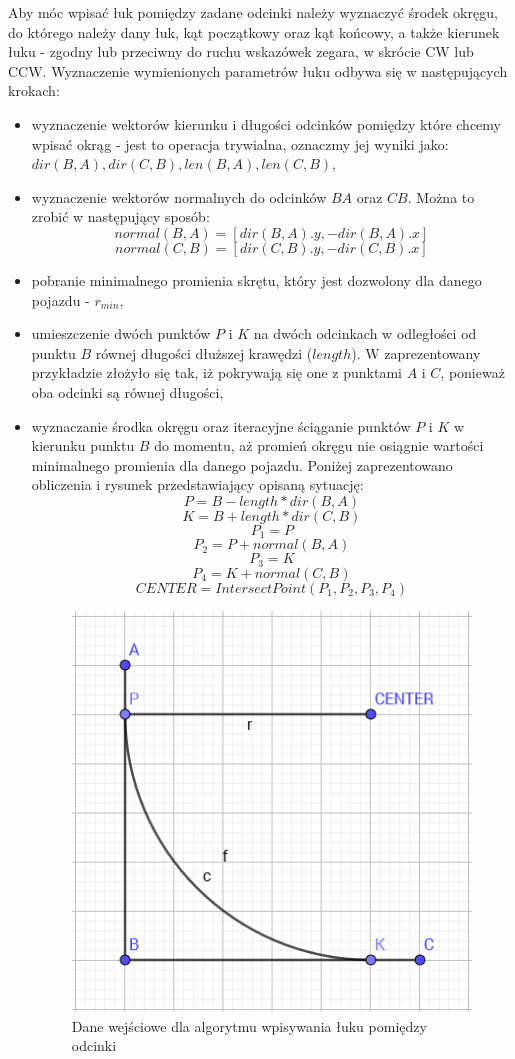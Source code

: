 \documentclass[a4paper,11pt,twoside]{report}
\theoremstyle{definition}
\begin{document}
Aby móc wpisać łuk pomiędzy zadane odcinki należy wyznaczyć środek okręgu, do którego należy dany łuk, kąt początkowy oraz kąt końcowy, a także kierunek łuku - zgodny lub przeciwny do ruchu wskazówek zegara, w skrócie CW lub CCW. Wyznaczenie wymienionych parametrów łuku odbywa się w następujących krokach:
\begin{itemize}
	\item wyznaczenie wektorów kierunku i długości odcinków pomiędzy które chcemy wpisać okrąg - jest to operacja trywialna, oznaczmy jej wyniki jako: $dir(B,A), dir(C,B), len(B,A), len(C,B)$,
	\item wyznaczenie wektorów normalnych do odcinków $BA$ oraz $CB$. Można to zrobić w następujący sposób:
	$$normal(B,A) = [dir(B,A).y, -dir(B,A).x]$$
	$$normal(C,B) = [dir(C,B).y, -dir(C,B).x]$$
	\item pobranie minimalnego promienia skrętu, który jest dozwolony dla danego pojazdu - $r_{min}$,
	\item umieszczenie dwóch punktów $P$ i $K$ na dwóch odcinkach w odległości od punktu $B$ równej długości dłuższej krawędzi ($length$). W zaprezentowany przykładzie złożyło się tak, iż pokrywają się one z punktami $A$ i $C$, ponieważ oba odcinki są równej długości,
	\item wyznaczanie środka okręgu oraz iteracyjne ściąganie punktów $P$ i $K$ w kierunku punktu $B$ do momentu, aż promień okręgu nie osiągnie wartości minimalnego promienia dla danego pojazdu. Poniżej zaprezentowano obliczenia i rysunek przedstawiający opisaną sytuację:
	$$P = B - length * dir(B,A)$$
	$$K = B + length * dir(C,B)$$
	$$P_{1} = P$$
	$$P_{2} = P + normal(B,A)$$
	$$P_{3} = K$$
	$$P_{4} = K + normal(C,B)$$
	$$CENTER = IntersectPoint(P_{1}, P_{2}, P_{3}, P_{4})$$

\begin{figure}[h!]
\centering
\includegraphics[scale=0.35]{arcsAlgorithmStep2}
\caption[Dane wejściowe dla algorytmu wpisywania łuku pomiędzy odcinki]{Dane wejściowe dla algorytmu wpisywania łuku pomiędzy odcinki}
\end{figure}


\end{itemize}
\end{document}
